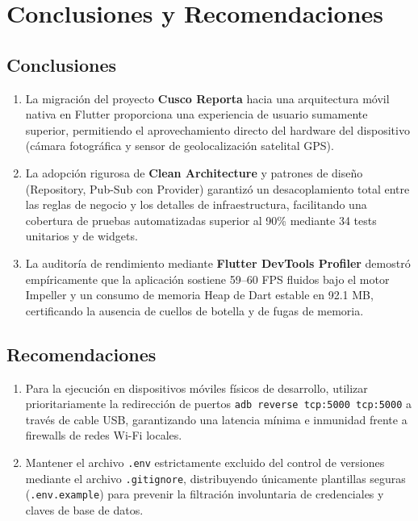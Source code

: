 \documentclass[12pt,a4paper]{article}
\begin{document}
\section{Conclusiones y Recomendaciones}

\subsection{Conclusiones}
\begin{enumerate}[leftmargin=*]
    \item La migración del proyecto \textbf{Cusco Reporta} hacia una arquitectura móvil nativa en Flutter proporciona una experiencia de usuario sumamente superior, permitiendo el aprovechamiento directo del hardware del dispositivo (cámara fotográfica y sensor de geolocalización satelital GPS).
    \item La adopción rigurosa de \textbf{Clean Architecture} y patrones de diseño (Repository, Pub-Sub con Provider) garantizó un desacoplamiento total entre las reglas de negocio y los detalles de infraestructura, facilitando una cobertura de pruebas automatizadas superior al 90\% mediante 34 tests unitarios y de widgets.
    \item La auditoría de rendimiento mediante \textbf{Flutter DevTools Profiler} demostró empíricamente que la aplicación sostiene 59--60 FPS fluidos bajo el motor Impeller y un consumo de memoria Heap de Dart estable en 92.1 MB, certificando la ausencia de cuellos de botella y de fugas de memoria.
\end{enumerate}

\subsection{Recomendaciones}
\begin{enumerate}[leftmargin=*]
    \item Para la ejecución en dispositivos móviles físicos de desarrollo, utilizar prioritariamente la redirección de puertos \texttt{adb reverse tcp:5000 tcp:5000} a través de cable USB, garantizando una latencia mínima e inmunidad frente a firewalls de redes Wi-Fi locales.
    \item Mantener el archivo \texttt{.env} estrictamente excluido del control de versiones mediante el archivo \texttt{.gitignore}, distribuyendo únicamente plantillas seguras (\texttt{.env.example}) para prevenir la filtración involuntaria de credenciales y claves de base de datos.
\end{enumerate}
\end{document}
